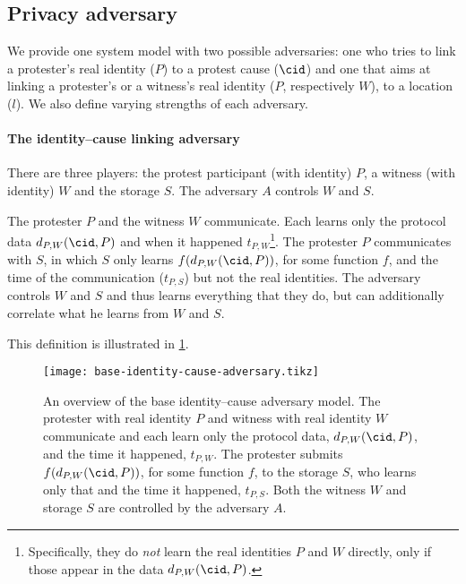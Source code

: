 \subsection{Privacy adversary}%
\label{adversary-model-different-levels}

We provide one system model with two possible adversaries: one who tries to link a protester's real identity (\(P\)) to a protest cause (\(\cid\)) and one 
that aims at linking a protester's or a witness's real identity (\(P\), respectively \(W\)), to a location (\(l\)).
We also define varying strengths of each adversary.

\paragraph{The identity--cause linking adversary}

There are three players: the protest participant (with identity) \(P\), a witness (with identity) \(W\) and the storage \(S\).
The adversary \(A\) controls \(W\) and \(S\).

\begin{definition}%
  \label{base-identity-cause-adversary}
  The protester \(P\) and the witness \(W\) communicate.
  Each learns only the protocol data \(d_{P,W}(\cid, P)\) and when it happened 
  \(t_{P,W}\)\footnote{%
    Specifically, they do \emph{not} learn the real identities \(P\) and \(W\) 
    directly, only if those appear in the data \(d_{P,W}(\cid, P)\).
  }.
  The protester \(P\) communicates with \(S\), in which \(S\) only learns 
  \(f(d_{P,W}(\cid, P))\), for some function \(f\), and the time of the 
  communication (\(t_{P,S}\)) but not the real identities.
  The adversary controls \(W\) and \(S\) and thus learns everything that they 
  do, but can additionally correlate what he learns from \(W\) and \(S\).
\end{definition}

This definition is illustrated in \cref{fig:identity-cause-adversary}.

\begin{figure}
  \centering
  \texttt{[image: base-identity-cause-adversary.tikz]}
  \caption{\label{fig:identity-cause-adversary}%
    An overview of the base identity--cause adversary model.
    The protester with real identity \(P\) and witness with real identity \(W\) 
    communicate and each learn only the protocol data, \(d_{P,W}(\cid, P)\), 
    and the time it happened, \(t_{P,W}\).
    The protester submits \(f(d_{P,W}(\cid, P))\), for some function \(f\), to 
    the storage \(S\), who learns only that and the time it happened, 
    \(t_{P,S}\).
    Both the witness \(W\) and storage \(S\) are controlled by the adversary 
    \(A\).
  }
\end{figure}

